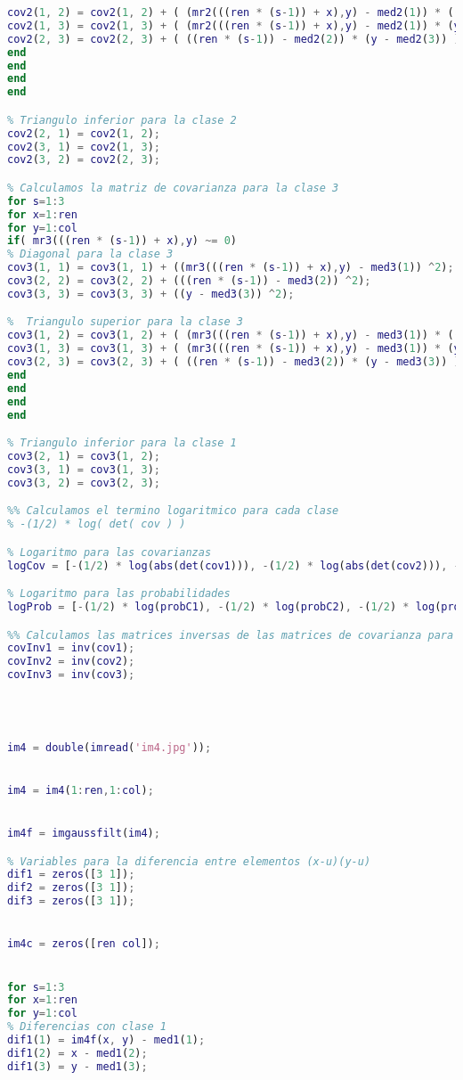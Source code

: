 \documentclass[10pt,journal,compsoc]{IEEEtran}
\begin{document}
\begin{lstlisting}[language=Matlab,basicstyle=\small]
%  Triangulo superior para la clase 2
cov2(1, 2) = cov2(1, 2) + ( (mr2(((ren * (s-1)) + x),y) - med2(1)) * ((ren * (s-1)) - med2(2)) );
cov2(1, 3) = cov2(1, 3) + ( (mr2(((ren * (s-1)) + x),y) - med2(1)) * (y - med2(3)) );
cov2(2, 3) = cov2(2, 3) + ( ((ren * (s-1)) - med2(2)) * (y - med2(3)) );
end
end
end
end

% Triangulo inferior para la clase 2
cov2(2, 1) = cov2(1, 2);
cov2(3, 1) = cov2(1, 3);
cov2(3, 2) = cov2(2, 3);

% Calculamos la matriz de covarianza para la clase 3
for s=1:3
for x=1:ren
for y=1:col
if( mr3(((ren * (s-1)) + x),y) ~= 0)
% Diagonal para la clase 3
cov3(1, 1) = cov3(1, 1) + ((mr3(((ren * (s-1)) + x),y) - med3(1)) ^2);
cov3(2, 2) = cov3(2, 2) + (((ren * (s-1)) - med3(2)) ^2);
cov3(3, 3) = cov3(3, 3) + ((y - med3(3)) ^2);

%  Triangulo superior para la clase 3
cov3(1, 2) = cov3(1, 2) + ( (mr3(((ren * (s-1)) + x),y) - med3(1)) * ((ren * (s-1)) - med3(2)) );
cov3(1, 3) = cov3(1, 3) + ( (mr3(((ren * (s-1)) + x),y) - med3(1)) * (y - med3(3)) );
cov3(2, 3) = cov3(2, 3) + ( ((ren * (s-1)) - med3(2)) * (y - med3(3)) );
end
end
end
end

% Triangulo inferior para la clase 1
cov3(2, 1) = cov3(1, 2);
cov3(3, 1) = cov3(1, 3);
cov3(3, 2) = cov3(2, 3);

%% Calculamos el termino logaritmico para cada clase
% -(1/2) * log( det( cov ) )

% Logaritmo para las covarianzas
logCov = [-(1/2) * log(abs(det(cov1))), -(1/2) * log(abs(det(cov2))), -(1/2) * log(abs(det(cov3)))];

% Logaritmo para las probabilidades
logProb = [-(1/2) * log(probC1), -(1/2) * log(probC2), -(1/2) * log(probC3)];

%% Calculamos las matrices inversas de las matrices de covarianza para cada clase
covInv1 = inv(cov1);
covInv2 = inv(cov2);
covInv3 = inv(cov3);




im4 = double(imread('im4.jpg'));


im4 = im4(1:ren,1:col);


im4f = imgaussfilt(im4);

% Variables para la diferencia entre elementos (x-u)(y-u)
dif1 = zeros([3 1]);
dif2 = zeros([3 1]);
dif3 = zeros([3 1]);


im4c = zeros([ren col]);


for s=1:3
for x=1:ren
for y=1:col
% Diferencias con clase 1
dif1(1) = im4f(x, y) - med1(1);
dif1(2) = x - med1(2);
dif1(3) = y - med1(3);


\end{lstlisting}
\end{document}
